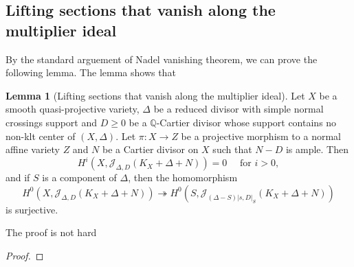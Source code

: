 \documentclass[11pt]{article}
\theoremstyle{definition}
\newtheorem{lemma}[theorem]{Lemma}
\begin{document}
	\subsection{Lifting sections that vanish along the multiplier ideal}
	By the standard arguement of Nadel vanishing theorem, we can prove the following lemma. The lemma shows that 
	\begin{lemma}[Lifting sections that vanish along the multiplier ideal]
		Let $X$ be a smooth quasi-projective variety, $\Delta$ be a reduced divisor with simple normal crossings support and $D \geq 0$ be a $\mathbb{Q}$-Cartier divisor whose support contains no non-klt center of $(X, \Delta)$. Let $\pi: X \rightarrow Z$ be a projective morphism to a normal affine variety $Z$ and $N$ be a Cartier divisor on $X$ such that $N-D$ is ample. Then
		$$
		H^i\left(X, \mathscr{J}_{\Delta, D}\left(K_X+\Delta+N\right)\right)=0 \quad \text { for } i>0,
		$$
		and if $S$ is a component of $\Delta$, then the homomorphism
		$$
		H^0\left(X, \mathscr{J}_{\Delta, D}\left(K_X+\Delta+N\right)\right) \twoheadrightarrow H^0\left(S, \mathscr{J}_{(\Delta-S)|s, D|_S}\left(K_X+\Delta+N\right)\right)
		$$
		is surjective.
	\end{lemma} 
	The proof is not hard
	\begin{proof}
		
	\end{proof}
	
\end{document}
